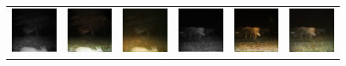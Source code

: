 \begin{figure}
\begin{tabularx}{\textwidth}{Y Y Y !{\space} Y Y Y}
        \includegraphics{gfx/conditional-diffusion-sampling-qual/nir_S2_B06_R1_PICT0387.jpg} & \includegraphics{gfx/conditional-diffusion-sampling-qual/cyclegan_S2_B06_R1_PICT0387_fake.png} & \includegraphics{gfx/conditional-diffusion-sampling-qual/diffusion_S2_B06_R1_PICT0387.png} & \includegraphics{gfx/conditional-diffusion-sampling-qual/nir_S2_B06_R3_PICT1364.jpg} & \includegraphics{gfx/conditional-diffusion-sampling-qual/cyclegan_S2_B06_R3_PICT1364_fake.png} & \includegraphics{gfx/conditional-diffusion-sampling-qual/diffusion_S2_B06_R3_PICT1364.png} \\

\end{tabularx}
\end{figure}
